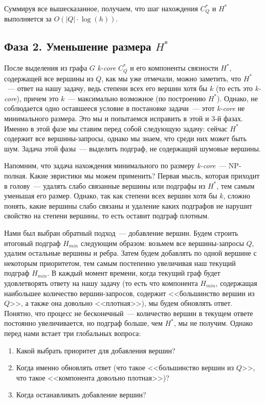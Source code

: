 \documentclass[11pt,a4paper,oneside]{article}
\begin{document}
Суммируя все вышесказанное, получаем, что шаг нахождения $C_Q^*$ и $H^*$ выполняется за $O(|Q| \cdot \log(h))$.

\subsection{Фаза 2. Уменьшение размера $H^*$}

После выделения из графа $G$ \textit{k-core} $C_Q^*$ и его компоненты связности $H^*$, содержащей все вершины из $Q$, как мы уже отмечали, можно заметить, что $H^*$~--- ответ на нашу задачу, ведь степени всех его вершин хотя бы $k$ (то есть это \textit{k-core}), причем это $k$~--- максимально возможное (по построению $H^*$). Однако, не соблюдается одно оставшееся условие в постановке задачи~--- этот \textit{k-core} не минимального размера. Это мы и попытаемся исправить в этой и $3$-й фазах. Именно в этой фазе мы ставим перед собой следующую задачу: сейчас $H^*$ содержит все вершины-запросы, однако мы знаем, что среди них может быть шум. Задача этой фазы~--- выделить подграф, не содержащий шумовые вершины.

Напомним, что задача нахождения минимального по размеру \textit{k-core}~--- NP-полная. Какие эвристики мы можем применить? Первая мысль, которая приходит в голову~--- удалять слабо связанные вершины или подграфы из $H^*$, тем самым уменьшая его размер. Однако, так как степени всех вершин хотя бы $k$, сложно понять, какие вершины слабо связаны и удаление каких подграфов не нарушит свойство на степени вершины, то есть оставит подграф плотным. 

Нами был выбран обратный подход~--- добавление вершин. Будем строить итоговый подграф $H_{min}$ следующим образом: возьмем все вершины-запросы $Q$, удалим остальные вершины и ребра. Затем будем добавлять по одной вершине с некоторым приоритетом, тем самым постепенно увеличивая наш текущий подграф $H_{min}$. В каждый момент времени, когда текущий граф будет удовлетворять ответу на нашу задачу (то есть что компонента $H_{min}$, содержащая наибольшее количество вершин-запросов, содержит <<большинство вершин из $Q$>>, а также она довольно <<плотная>>), мы будем обновлять ответ. Понятно, что процесс не бесконечный~--- количество вершин в текущем ответе постоянно увеличивается, но подграф больше, чем $H^*$, мы не получим. Однако перед нами встает три глобальных вопроса:

\begin{enumerate}
  \item Какой выбрать приоритет для добавления вершин?
  \item Когда именно обновлять ответ (что такое <<большинство вершин из $Q$>>, что такое <<компонента довольно плотная>>)?
  \item Когда останавливать добавление вершин?
\end{enumerate}
\end{document}
